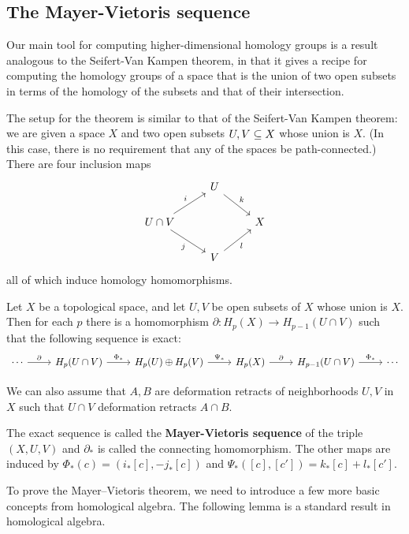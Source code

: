 \subsection{The Mayer-Vietoris sequence}
Our main tool for computing higher-dimensional homology groups is a result analogous to the Seifert-Van Kampen theorem, in that it gives a recipe for computing the homology groups of a space that is the union of two open subsets in terms of the homology of the subsets and that of their intersection.\par
The setup for the theorem is similar to that of the Seifert-Van Kampen theorem: we are given a space $X$ and two open subsets $U,V\subseteq X$ whose union is $X$. (In this case, there is no requirement that any of the spaces be path-connected.) There are four inclusion maps
\[\begin{tikzcd}
&U\ar[rd,"k"]&\\
U\cap V\ar[ru,"i"]\ar[rd,swap,"j"]&&X\\
&V\ar[ru,swap,"l"]&
\end{tikzcd}\]
all of which induce homology homomorphisms.
\begin{theorem}
Let $X$ be a topological space, and let $U,V$ be
open subsets of $X$ whose union is $X$. Then for each $p$ there is a homomorphism $\partial:H_p(X)\to H_{p-1}(U\cap V)$ such that the following sequence is exact:
\[\begin{tikzcd}
\cdots\ar[r,"\partial"]&H_p(U\cap V)\ar[r,"\Phi_*"]&H_p(U)\oplus H_p(V)\ar[r,"\Psi_*"]&H_p(X)\ar[r,"\partial"]&H_{p-1}(U\cap V)\ar[r,"\Phi_*"]&\cdots
\end{tikzcd}\]
\end{theorem}
\begin{remark}
We can also assume that $A,B$ are deformation retracts of neighborhoods $U,V$ in $X$ such that $U\cap V$ deformation retracts $A\cap B$.
\end{remark}
The exact sequence is called the \textbf{Mayer-Vietoris sequence} of the triple $(X,U,V)$ and $\partial_*$ is called the connecting homomorphism. The other maps are induced by $\Phi_*(c)=(i_*[c],-j_*[c])$ and $\Psi_*([c],[c'])=k_*[c]+l_*[c']$.\par
To prove the Mayer–Vietoris theorem, we need to introduce a few more basic
concepts from homological algebra. The following lemma is a standard result in homological algebra.
